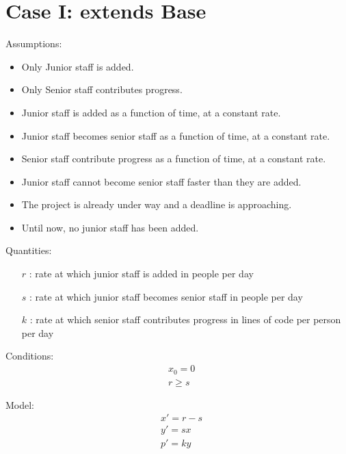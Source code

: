 \documentclass{article}
\newenvironment{atomize}
    {\begin{list} {} {
            \setlength\itemindent{0pt}
            \setlength\leftmargin{10pt}
            \setlength\labelwidth{0pt}
    }}
    {\end{list}}
\begin{document}
\section*{Case I: extends Base}
  \begin{atomize}
    \item Assumptions:
      \begin{itemize}
        \item Only Junior staff is added.
        \item Only Senior staff contributes progress.
        \item Junior staff is added as a function of time, at a constant rate.
        \item Junior staff becomes senior staff as a function of time, at a
        constant rate.
        \item Senior staff contribute progress as a function of time, at a
        constant rate.
        \item Junior staff cannot become senior staff faster than they are
        added.
        \item The project is already under way and a deadline is approaching.
        \item Until now, no junior staff has been added.
      \end{itemize}

    \item Quantities:
      \begin{itemize} 
        \item [$r$]: rate at which junior staff is added in people per day 
        \item [$s$]: rate at which junior staff becomes senior staff in people per day
        \item [$k$]: rate at which senior staff contributes progress in lines of
        code per person per day
      \end{itemize}

    \item Conditions:
      \begin{align*}
        &x_{0} = 0 \\[6pt]
        &r \geq s
      \end{align*}

    \item Model:
      \begin{align*}
        &x\prime = r - s \\[6pt]
        &y\prime = sx \\[6pt]
        &p\prime = ky
      \end{align*}


\end{atomize}
\end{document}
